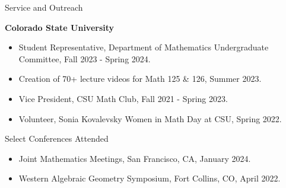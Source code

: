 \documentclass[
	11pt, %
]{resume} %
\begin{document}
\begin{rSection}{Service and Outreach}

	\textbf{Colorado State University}
	\begin{itemize}
		\item{Student Representative, Department of Mathematics Undergraduate Committee, Fall 2023 - Spring 2024.}
		\item{Creation of 70+ lecture videos for Math 125 \& 126, Summer 2023.}
		\item{Vice President, CSU Math Club, Fall 2021 - Spring 2023.}
		\item{Volunteer, Sonia Kovalevsky Women in Math Day at CSU, Spring 2022.}
	\end{itemize}
	
\end{rSection}


\begin{rSection}{Select Conferences Attended}

	\begin{itemize}
		\item{Joint Mathematics Meetings, San Francisco, CA, January 2024.}
		\item{Western Algebraic Geometry Symposium, Fort Collins, CO, April 2022.}
	\end{itemize}
	
\end{rSection}





\fancyfoot{}
\end{document}
